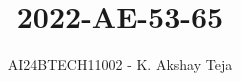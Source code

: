 \documentclass[journal,9pt,onecolumn]{IEEEtran}
\begin{document}

\vspace{3cm}
\title{2022-AE-53-65}
\author{AI24BTECH11002 - K. Akshay Teja}
\maketitle
 \bigskip
{\let\newpage\relax\maketitle}

\renewcommand{\thefigure}{\theenumi}
\renewcommand{\thetable}{\theenumi}
\setlength{\intextsep}{10pt} %

\renewcommand{\thetable}{\theenumi}
\end{document}
